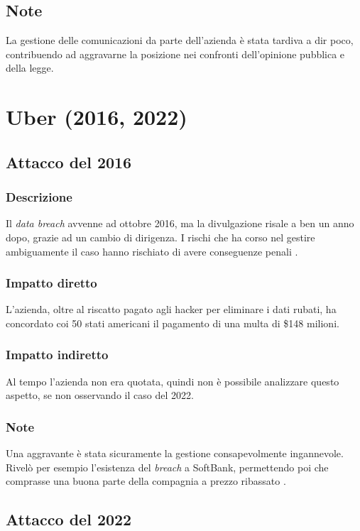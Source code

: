 \documentclass[12pt,a4paper,twoside]{report}
\begin{document}
\subsection{Note}
La gestione delle comunicazioni da parte dell'azienda \`e stata tardiva a dir poco, contribuendo ad aggravarne la posizione nei confronti dell'opinione pubblica e della legge.

\section{Uber (2016, 2022)} \label{sect:Uber_case}
\subsection{Attacco del 2016}
\subsubsection{Descrizione}
Il \textit{data breach} avvenne ad ottobre 2016, ma la divulgazione risale a ben un anno dopo, grazie ad un cambio di dirigenza. I rischi che ha corso nel gestire ambiguamente il caso hanno rischiato di avere conseguenze penali \cite{Uber_plusEquifaxAndYahoo}.\\ 
\subsubsection{Impatto diretto}
L'azienda, oltre al riscatto pagato agli hacker per eliminare i dati rubati, ha concordato coi 50 stati americani il pagamento di una multa di \$148 milioni.\\
\subsubsection{Impatto indiretto}
Al tempo l'azienda non era quotata, quindi non \`e possibile analizzare questo aspetto, se non osservando il caso del 2022.\\
\subsubsection{Note}
Una aggravante \`e stata sicuramente la gestione consapevolmente ingannevole. Rivel\`o per esempio  l'esistenza del \textit{breach} a SoftBank, permettendo poi che comprasse una buona parte della compagnia a prezzo ribassato \cite{Uber_plusEquifaxAndYahoo}.\\   
\subsection{Attacco del 2022}
\end{document}
